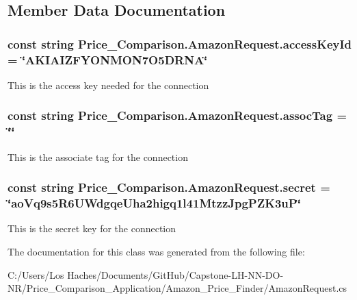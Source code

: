\subsection{Member Data Documentation}
\hypertarget{class_price___comparison_1_1_amazon_request_ae6439e3c8506b3b5549c2b5784afb430}{
\subsubsection[{access\-Key\-Id}]{\setlength{\rightskip}{0pt plus 5cm}const string Price\-\_\-\-Comparison.\-Amazon\-Request.\-access\-Key\-Id = \char`\"{}A\-K\-I\-A\-I\-Z\-F\-Y\-O\-N\-M\-O\-N7\-O5\-D\-R\-N\-A\char`\"{}\hspace{0.3cm}{\ttfamily [private]}}}\label{class_price___comparison_1_1_amazon_request_ae6439e3c8506b3b5549c2b5784afb430}
This is the access key needed for the connection \hypertarget{class_price___comparison_1_1_amazon_request_a6002b57f55377cdbd2c22d4a2690ea46}{
\subsubsection[{assoc\-Tag}]{\setlength{\rightskip}{0pt plus 5cm}const string Price\-\_\-\-Comparison.\-Amazon\-Request.\-assoc\-Tag = \char`\"{}\char`\"{}\hspace{0.3cm}{\ttfamily [private]}}}\label{class_price___comparison_1_1_amazon_request_a6002b57f55377cdbd2c22d4a2690ea46}
This is the associate tag for the connection \hypertarget{class_price___comparison_1_1_amazon_request_a7579fb44ab93ada136d11eb887ebd0ef}{
\subsubsection[{secret}]{\setlength{\rightskip}{0pt plus 5cm}const string Price\-\_\-\-Comparison.\-Amazon\-Request.\-secret = \char`\"{}ao\-Vq9s5\-R6\-U\-Wdgqe\-Uha2higq1l41\-Mtzz\-Jpg\-P\-Z\-K3u\-P\char`\"{}\hspace{0.3cm}{\ttfamily [private]}}}\label{class_price___comparison_1_1_amazon_request_a7579fb44ab93ada136d11eb887ebd0ef}
This is the secret key for the connection 

The documentation for this class was generated from the following file\-:\begin{DoxyCompactItemize}
\item 
C\-:/\-Users/\-Los Haches/\-Documents/\-Git\-Hub/\-Capstone-\/\-L\-H-\/\-N\-N-\/\-D\-O-\/\-N\-R/\-Price\-\_\-\-Comparison\-\_\-\-Application/\-Amazon\-\_\-\-Price\-\_\-\-Finder/Amazon\-Request.\-cs\end{DoxyCompactItemize}
